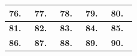\begin{center}
\begin{tabular}{|p{2.7cm}|p{2.7cm}|p{2.7cm}|p{2.7cm}|p{2.7cm}|}
\hline
\textbf{76.}\ \underline{\hspace{1.3cm}} & \textbf{77.}\ \underline{\hspace{1.3cm}} & \textbf{78.}\ \underline{\hspace{1.3cm}} & \textbf{79.}\ \underline{\hspace{1.3cm}} & \textbf{80.}\ \underline{\hspace{1.3cm}} \\
\hline
\textbf{81.}\ \underline{\hspace{1.3cm}} & \textbf{82.}\ \underline{\hspace{1.3cm}} & \textbf{83.}\ \underline{\hspace{1.3cm}} & \textbf{84.}\ \underline{\hspace{1.3cm}} & \textbf{85.}\ \underline{\hspace{1.3cm}} \\
\hline
\textbf{86.}\ \underline{\hspace{1.3cm}} & \textbf{87.}\ \underline{\hspace{1.3cm}} & \textbf{88.}\ \underline{\hspace{1.3cm}} & \textbf{89.}\ \underline{\hspace{1.3cm}} & \textbf{90.}\ \underline{\hspace{1.3cm}} \\
\hline
\end{tabular}
\end{center}
